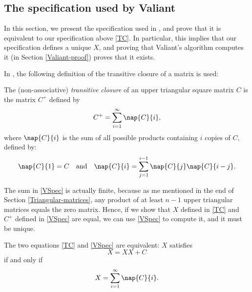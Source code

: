 \subsection{The specification used by Valiant}
In this section, we present the specification used in \cite{Valiant}, and prove that it is equivalent to our specification above \eqref{TC}. In particular, this implies that our specification defines a unique $X$, and proving that Valiant's algorithm computes it (in Section \ref{Valiant-proof}) proves that it exists.

In \cite{Valiant}, the following definition of the transitive closure of a matrix is used:
\begin{Definition}
  The (non-associative) \emph{transitive closure} of an upper triangular square matrix $C$ is the matrix $C^+$ defined by
  \begin{equation}\label{VSpec}
    C^+ = \sum_{i = 1}^\infty \nap{C}{i},
  \end{equation}
  where $\nap{C}{i}$ is the sum of all possible products containing $i$ copies of $C$, defined by:
  \begin{equation*}
    \nap{C}{1} = C \quad \text{and} \quad \nap{C}{i} = \sum_{j = 1}^{i - 1}\nap{C}{j}\nap{C}{i - j}.
  \end{equation*}
\end{Definition}
The sum in \eqref{VSpec} is actually finite, because as me mentioned in the end of Section \ref{Triangular-matrices}, any product of at least $n -1$ upper triangular matrices equals the zero matrix. Hence, if we show that $X$ defined in \eqref{TC} and $C^+$ defined in \eqref{VSpec} are equal, we can use \eqref{VSpec} to compute it, and it must be unique.
 \begin{Proposition}
   The two equations \eqref{TC} and \eqref{VSpec} are equivalent: $X$ satisfies 
   \begin{equation}
     X = XX + C
   \end{equation}
   if and only if 
   \begin{equation}
     X = \sum_{i = 1}^\infty \nap{C}{i}.
   \end{equation}
 \end{Proposition}

